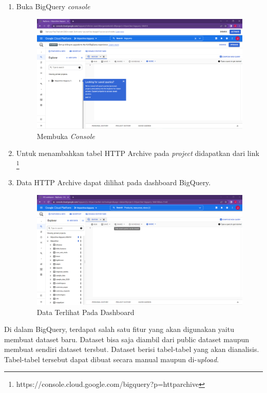 \begin{enumerate}
	\item Buka BigQuery \textit{console} 
	\begin{figure}[H]
		\centering  
		\includegraphics[scale=0.35]{Gambar/bq_workspace.PNG}  
		\caption{Membuka \textit{Console}} 
		\label{fig:open_console} 
	\end{figure}
	
	\item Untuk menambahkan tabel HTTP Archive pada \textit{project} didapatkan dari link \footnote{https://console.cloud.google.com/bigquery?p=httparchive}
	
	
	\item Data HTTP Archive dapat dilihat pada dashboard BigQuery.
	\begin{figure}[H]
		\centering  
		\includegraphics[scale=0.35]{Gambar/BG-Dashboard.PNG}  
		\caption{Data Terlihat Pada Dashboard} 
		\label{fig:BQ-Dashboard} 
	\end{figure}
\end{enumerate}

Di dalam BigQuery, terdapat salah satu fitur yang akan digunakan yaitu membuat dataset baru. Dataset bisa saja diambil dari public dataset maupun membuat sendiri dataset tersbut. Dataset berisi tabel-tabel yang akan dianalisis. Tabel-tabel tersebut dapat dibuat secara manual maupun di-\textit{upload}.

